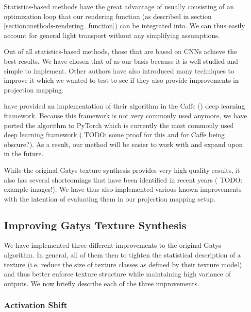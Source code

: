 Statistics-based methods have the great advantage of usually consisting of an optimization loop that our rendering function (as described in section \ref{section:methods-rendering_function}) can be integrated into. We can thus easily account for general light transport without any simplifying assumptions.

Out of all statistics-based methods, those that are based on CNNs achieve the best results. We have chosen that of \citet{Gatys2015} as our basis because it is well studied and simple to implement. Other authors have also introduced many techniques to improve it which we wanted to test to see if they also provide improvements in projection mapping.

\citet{Gatys2015} have provided an implementation of their algorithm in the Caffe (\citet{Jia2014}) deep learning framework. Because this framework is not very commonly used anymore, we have ported the algorithm to PyTorch which is currently the most commonly used deep learning framework ({\color{red} TODO: some proof for this and for Caffe being obscure?}). As a result, our method will be easier to work with and expand upon in the future.

While the original Gatys texture synthesis provides very high quality results, it also has several shortcomings that have been identified in recent years ({\color{red} TODO: example images!}). We have thus also implemented various known improvements with the intention of evaluating them in our projection mapping setup.

\subsection{Improving Gatys Texture Synthesis}
\label{section:methods-texture_model-improvements}

We have implemented three different improvements to the original Gatys algorithm. In general, all of them then to tighten the statistical description of a texture (i.e. reduce the size of texture classes as defined by their texture model) and thus better enforce texture structure while maintaining high variance of outputs. We now briefly describe each of the three improvements.

\subsubsection{Activation Shift}
\label{section:methods-texture_model-improvements-activation_shift}

